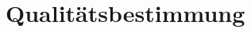 \documentclass[pflichtenheft.tex]{subfiles}
\begin{document}
\chapter{Qualitätsbestimmung}
\end{document}
